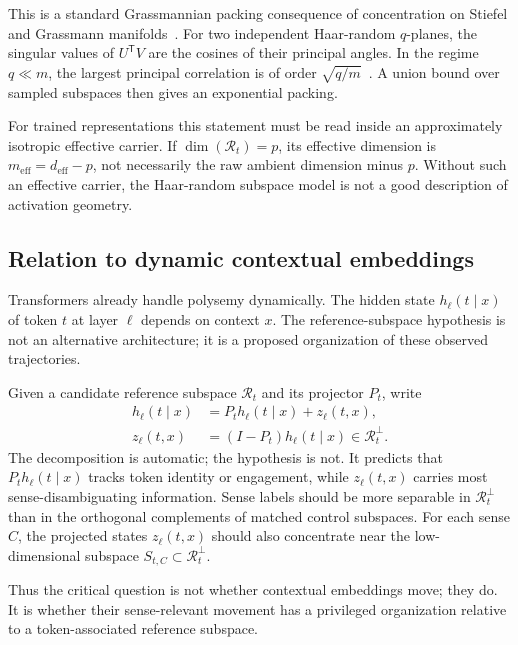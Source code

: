 \documentclass[
  aps,
  reprint,
  superscriptaddress,
  floatfix,
  nofootinbib,
  longbibliography
]{revtex4-2}
\newcommand{\deff}{d_{\mathrm{eff}}}
\newcommand{\meff}{m_{\mathrm{eff}}}
\newcommand{\T}{^{\mathsf{T}}}
\begin{document}
This is a standard Grassmannian packing consequence of concentration on
Stiefel and Grassmann manifolds~\cite{szarek1982nets,conway1996packings}.
For two independent Haar-random $q$-planes, the singular values of $U\T V$
are the cosines of their principal angles. In the regime $q\ll m$, the
largest principal correlation is of order
$\sqrt{q/m}$~\cite{chikuse2003statistics,absil2006condition,edelman1998random}.
A union bound over sampled subspaces then gives an exponential packing.

For trained representations this statement must be read inside an
approximately isotropic effective carrier. If
$\dim(\mathcal R_t)=p$, its effective dimension is
$\meff=\deff-p$, not necessarily the raw ambient dimension minus $p$.
Without such an effective carrier, the Haar-random subspace model is not a
good description of activation geometry.

\subsection{Relation to dynamic contextual embeddings}
\label{sec:dynamic}

Transformers already handle polysemy dynamically. The hidden state
$h_\ell(t\mid x)$ of token $t$ at layer $\ell$ depends on context $x$.
The reference-subspace hypothesis is not an alternative architecture; it is
a proposed organization of these observed trajectories.

Given a candidate reference subspace $\mathcal R_t$ and its projector $P_t$,
write
%
\begin{align}
\label{eq:layer-decomp}
h_\ell(t\mid x)
&=P_t h_\ell(t\mid x)+z_\ell(t,x),\\
z_\ell(t,x)&=(I-P_t)h_\ell(t\mid x)
\in\mathcal R_t^\perp.\nonumber
\end{align}
%
The decomposition is automatic; the hypothesis is not. It predicts that
$P_t h_\ell(t\mid x)$ tracks token identity or engagement, while
$z_\ell(t,x)$ carries most sense-disambiguating information. Sense labels
should be more separable in $\mathcal R_t^\perp$ than in the orthogonal
complements of matched control subspaces. For each sense $C$, the projected
states $z_\ell(t,x)$ should also concentrate near the low-dimensional
subspace $S_{t,C}\subset\mathcal R_t^\perp$.

Thus the critical question is not whether contextual embeddings move; they
do. It is whether their sense-relevant movement has a privileged
organization relative to a token-associated reference subspace.
\end{document}
